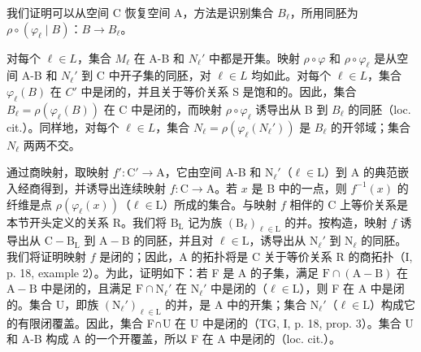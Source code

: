 我们证明可以从空间 C 恢复空间 A，方法是识别集合 \(B_{\ell}\)，所用同胚为 \(\rho \circ (\varphi_{\ell} \mid B)\)：\(B \to B_{\ell}\)。

对每个 \(\ell \in L\)，集合 \(M_{\ell}\) 在 A-B 和 \(N_{\ell}'\) 中都是开集。映射 \(\rho \circ \varphi\) 和 \(\rho \circ \varphi_{\ell}\) 是从空间 A-B 和 \(N_{\ell}'\) 到 C 中开子集的同胚，对 \(\ell \in L\) 均如此。对每个 \(\ell \in L\)，集合 \(\varphi_{\ell}(B)\) 在 \(C'\) 中是闭的，并且关于等价关系 S 是饱和的。因此，集合 \(B_{\ell} = \rho(\varphi_{\ell}(B))\) 在 C 中是闭的，而映射 \(\rho \circ \varphi_{\ell}\) 诱导出从 B 到 \(B_{\ell}\) 的同胚（loc. cit.）。同样地，对每个 \(\ell \in L\)，集合 \(N_{\ell} = \rho(\varphi_{\ell}(N_{\ell}'))\) 是 \(B_{\ell}\) 的开邻域；集合 \(N_{\ell}\) 两两不交。

通过商映射，取映射 \(f' \colon \mathrm{C}' \to \mathrm{A}\)，它由空间 A-B 和 \(\mathrm{N}_{\ell}'\)（\(\ell \in \mathrm{L}\)）到 A 的典范嵌入经商得到，并诱导出连续映射 \(f \colon \mathrm{C} \to \mathrm{A}\)。若 \(x\) 是 B 中的一点，则 \(f^{-1}(x)\) 的纤维是点 \(\rho(\varphi_{\ell}(x))\)（\(\ell \in \mathrm{L}\)）所成的集合。与映射 \(f\) 相伴的 C 上等价关系是本节开头定义的关系 R。我们将 \(\mathrm{B}_{\mathrm{L}}\) 记为族 \((\mathrm{B}_{\ell})_{\ell \in \mathrm{L}}\) 的并。按构造，映射 \(f\) 诱导出从 \(\mathrm{C} - \mathrm{B}_{\mathrm{L}}\) 到 \(\mathrm{A} - \mathrm{B}\) 的同胚，并且对 \(\ell \in \mathrm{L}\)，诱导出从 \(\mathrm{N}_{\ell}'\) 到 \(\mathrm{N}_{\ell}\) 的同胚。我们将证明映射 \(f\) 是闭的；因此，A 的拓扑将是 C 关于等价关系 R 的商拓扑（I, p. 18, example 2）。为此，证明如下：若 F 是 A 的子集，满足 \(\mathrm{F} \cap (\mathrm{A} - \mathrm{B})\) 在 \(\mathrm{A} - \mathrm{B}\) 中是闭的，且满足 \(\mathrm{F} \cap \mathrm{N}_{\ell}'\) 在 \(\mathrm{N}_{\ell}'\) 中是闭的（\(\ell \in \mathrm{L}\)），则 F 在 A 中是闭的。集合 U，即族 \((\mathrm{N}_{\ell}')_{\ell \in \mathrm{L}}\) 的并，是 A 中的开集；集合 \(\mathrm{N}_{\ell}'\)（\(\ell \in \mathrm{L}\)）构成它的有限闭覆盖。因此，集合 F∩U 在 U 中是闭的（TG, I, p. 18, prop. 3）。集合 U 和 A-B 构成 A 的一个开覆盖，所以 F 在 A 中是闭的（loc. cit.）。

